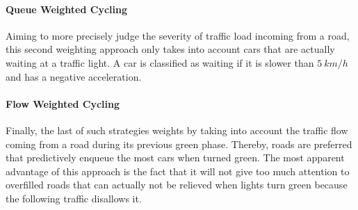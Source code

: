 \documentclass[10pt]{article}
\begin{document}
\paragraph{Queue Weighted Cycling} Aiming to more precisely judge the severity of traffic load incoming from a road, this second weighting approach only takes into account cars that are actually waiting at a traffic light. A car is classified as waiting if it is slower than $5\ km/h$ and has a negative acceleration.

\paragraph{Flow Weighted Cycling} Finally, the last of such strategies weights by taking into account the traffic flow coming from a road during its previous green phase. Thereby, roads are preferred that predictively enqueue the most cars when turned green. The most apparent advantage of this approach is the fact that it will not give too much attention to overfilled roads that can actually not be relieved when lights turn green because the following traffic disallows it.
\end{document}
